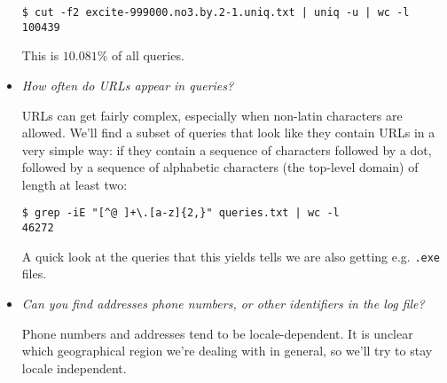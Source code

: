 \begin{itemize}
\begin{lstlisting}
$ cut -f2 excite-999000.no3.by.2-1.uniq.txt | uniq -u | wc -l
100439
\end{lstlisting}

This is $10.081\%$ of all queries.

\item \emph{How often do URLs appear in queries?}

URLs can get fairly complex, especially when non-latin characters are allowed.
We'll find a subset of queries that look like they contain URLs in a very
simple way: if they contain a sequence of characters followed by a dot,
followed by a sequence of alphabetic characters (the top-level domain) of
length at least two:

\begin{lstlisting}
$ grep -iE "[^@ ]+\.[a-z]{2,}" queries.txt | wc -l
46272
\end{lstlisting}

A quick look at the queries that this yields tells we are also getting e.g.
\texttt{.exe} files.






\item \emph{Can you find addresses phone numbers, or other identifiers in the
log file?}

Phone numbers and addresses tend to be locale-dependent. It is unclear which
geographical region we're dealing with in general, so we'll try to stay locale
independent.


\end{itemize}
